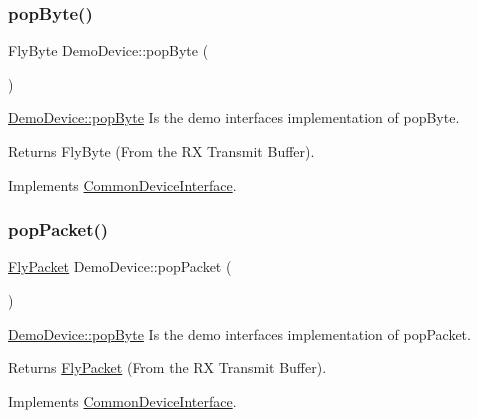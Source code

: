 \subsubsection{\texorpdfstring{pop\+Byte()}{popByte()}}
{\footnotesize\ttfamily Fly\+Byte Demo\+Device\+::pop\+Byte (\begin{DoxyParamCaption}{ }\end{DoxyParamCaption})\hspace{0.3cm}{\ttfamily [virtual]}}



\hyperlink{class_demo_device_a788dd7e426fab9c8d19ea9fd106260d4}{Demo\+Device\+::pop\+Byte} Is the demo interface\textquotesingle{}s implementation of pop\+Byte. 

\begin{DoxyReturn}{Returns}
Fly\+Byte (From the RX Transmit Buffer). 
\end{DoxyReturn}


Implements \hyperlink{class_common_device_interface}{Common\+Device\+Interface}.

\hypertarget{class_demo_device_a6e755f50f52301b9166e278fe6851e88}{}\label{class_demo_device_a6e755f50f52301b9166e278fe6851e88} 
\subsubsection{\texorpdfstring{pop\+Packet()}{popPacket()}}
{\footnotesize\ttfamily \hyperlink{class_fly_packet}{Fly\+Packet} Demo\+Device\+::pop\+Packet (\begin{DoxyParamCaption}{ }\end{DoxyParamCaption})\hspace{0.3cm}{\ttfamily [virtual]}}



\hyperlink{class_demo_device_a788dd7e426fab9c8d19ea9fd106260d4}{Demo\+Device\+::pop\+Byte} Is the demo interface\textquotesingle{}s implementation of pop\+Packet. 

\begin{DoxyReturn}{Returns}
\hyperlink{class_fly_packet}{Fly\+Packet} (From the RX Transmit Buffer). 
\end{DoxyReturn}


Implements \hyperlink{class_common_device_interface}{Common\+Device\+Interface}.

\hypertarget{class_demo_device_a064f0bc683663200243bd68ff3713c68}{}\label{class_demo_device_a064f0bc683663200243bd68ff3713c68} 
